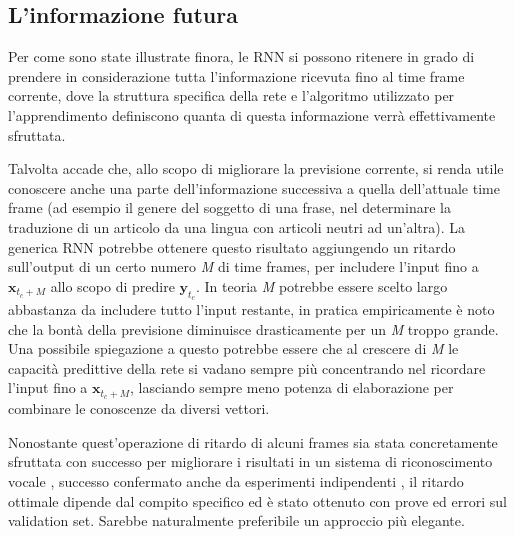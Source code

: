 \subsection{L'informazione futura} %
\label{sub:l_informazione_futura}
Per come sono state illustrate finora, le RNN si possono ritenere in grado di prendere in considerazione tutta l'informazione ricevuta fino al time frame corrente, dove la struttura specifica della rete e l'algoritmo utilizzato per l'apprendimento definiscono quanta di questa informazione verrà effettivamente sfruttata.

Talvolta accade che, allo scopo di migliorare la previsione corrente, si renda utile conoscere anche una parte dell'informazione successiva a quella dell'attuale time frame (ad esempio il genere del soggetto di una frase, nel determinare la traduzione di un articolo da una lingua con articoli neutri ad un'altra). La generica RNN potrebbe ottenere questo risultato aggiungendo un ritardo sull'output di un certo numero \textit{M} di time frames, per includere l'input fino a $\boldsymbol{x}_{t_c + M}$ allo scopo di predire $\boldsymbol{y}_{t_c}$. In teoria \textit{M} potrebbe essere scelto largo abbastanza da includere tutto l'input restante, in pratica empiricamente è noto che la bontà della previsione diminuisce drasticamente per un \textit{M} troppo grande. Una possibile spiegazione a questo potrebbe essere che al crescere di \textit{M} le capacità predittive della rete si vadano sempre più concentrando nel ricordare l'input fino a $\boldsymbol{x}_{t_c + M}$, lasciando sempre meno potenza di elaborazione per combinare le conoscenze da diversi vettori.

Nonostante quest'operazione di ritardo di alcuni frames sia stata concretamente sfruttata con successo per migliorare i risultati in un sistema di riconoscimento vocale \cite{phone}, successo confermato anche da esperimenti indipendenti \cite{BRNN}, il ritardo ottimale dipende dal compito specifico ed è stato ottenuto con prove ed errori sul validation set. Sarebbe naturalmente preferibile un approccio più elegante.

